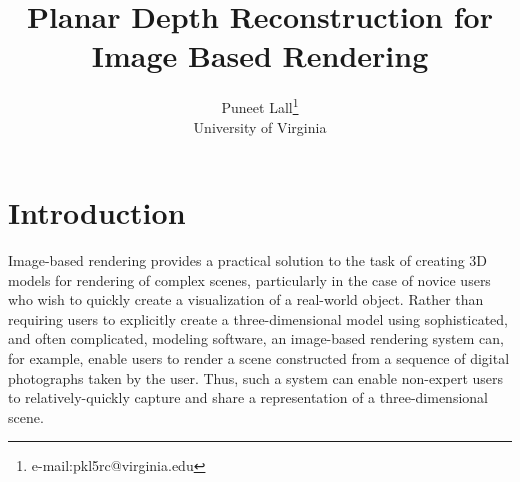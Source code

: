 \documentclass[conference]{acmsiggraph}
\title{Planar Depth Reconstruction for Image Based Rendering}
\author{Puneet Lall\thanks{e-mail:pkl5rc@virginia.edu}\\University of Virginia}
\begin{document}

\maketitle










\section{Introduction}

Image-based rendering provides a practical solution to the task of creating
3D models for rendering of complex scenes, particularly in the case of
novice users who wish to quickly create a visualization of a real-world object.
Rather than requiring users to explicitly create a three-dimensional model using
sophisticated, and often complicated, modeling software, an image-based rendering
system can, for example, 
enable users to render a scene constructed from a sequence of
digital photographs taken by the user.  Thus, such a system can enable
non-expert users to relatively-quickly capture and share a representation of
a three-dimensional scene.
 
\end{document}
